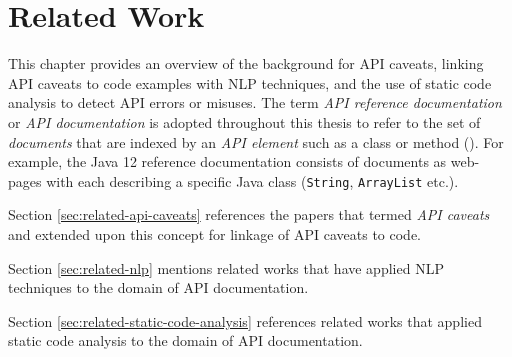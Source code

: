 \chapter{Related Work}
\label{cha:background}
This chapter provides an overview of the background for API caveats, linking API caveats to code examples with NLP techniques, and the use of static code analysis to detect API errors or misuses. The term \textit{API reference documentation} or \textit{API documentation} is adopted throughout this thesis to refer to the set of \textit{documents} that are indexed by an \textit{API element} such as a class or method (\cite{maalej2013patterns}). For example, the Java 12 reference documentation consists of documents as web-pages with each describing a specific Java class (\lstinline{String}, \lstinline{ArrayList} etc.). \bigbreak

Section \ref{sec:related-api-caveats} references the papers that termed \textit{API caveats} and extended upon this concept for linkage of API caveats to code.\bigbreak

Section \ref{sec:related-nlp} mentions related works that have applied NLP techniques to the domain of API documentation.\bigbreak

Section \ref{sec:related-static-code-analysis} references related works that applied static code analysis to the domain of API documentation.\bigbreak

